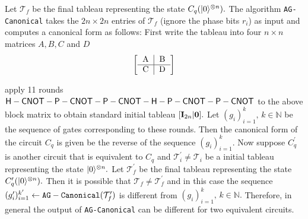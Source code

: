 Let $\mathcal{T}_f$ be the final tableau representing the state $C_q({\lvert}0\rangle^{\otimes n}).$ The algorithm  {\tt AG-Canonical}  takes the $2n\times 2n$ entries of $\mathcal{T}_f$ (ignore the phase bits $r_i$) as  input and computes a canonical form as follows: First write the tableau into four $n\times n$ matrices $A, B, C$ and $D$
\[
\left[
\begin{tabular}
[c]{c|c}
A&B \\\hline
C&D
\end{tabular}
\right]
\]



apply 11 rounds  ${\sf H}-{\sf CNOT}-{\sf P}-{\sf CNOT}-{\sf P}-{\sf CNOT}-{\sf H}-{\sf P}-{\sf CNOT}-{\sf P}-{\sf CNOT}$ to the above block matrix to obtain standard initial tableau $[{\bf I}_{2n}|{\bf 0}].$ Let $(g_i)_{i=1}^k,\, k\in\mathbb{N}$ be the sequence of gates corresponding to these rounds. Then the canonical form of the circuit $C_q$ is given be the reverse of the sequence $(g_i)_{i=1}^k.$ Now suppose $C_q^\prime$  is another circuit that is equivalent to
$C_q$ and $\mathcal{T}_i^\prime \neq \mathcal{T}_i$ be a initial tableau representing the state ${\lvert}0\rangle^{\otimes n}.$ Let $\mathcal{T}_f^\prime$ be the final tableau representing the state $C_q^\prime({\lvert}0\rangle^{\otimes n}).$ Then it is possible that $\mathcal{T}_f\neq \mathcal{T}_f^\prime$ and in this case the sequence $(g_i^\prime )_{i=1}^{k^\prime} \leftarrow {\tt AG-Canonical}(\mathcal{T}_f^\prime)$ is different from $(g_i)_{i=1}^k,\, k\in\mathbb{N}.$ Therefore, in general the output of {\tt AG-Canonical}  can be different for two equivalent circuits.
